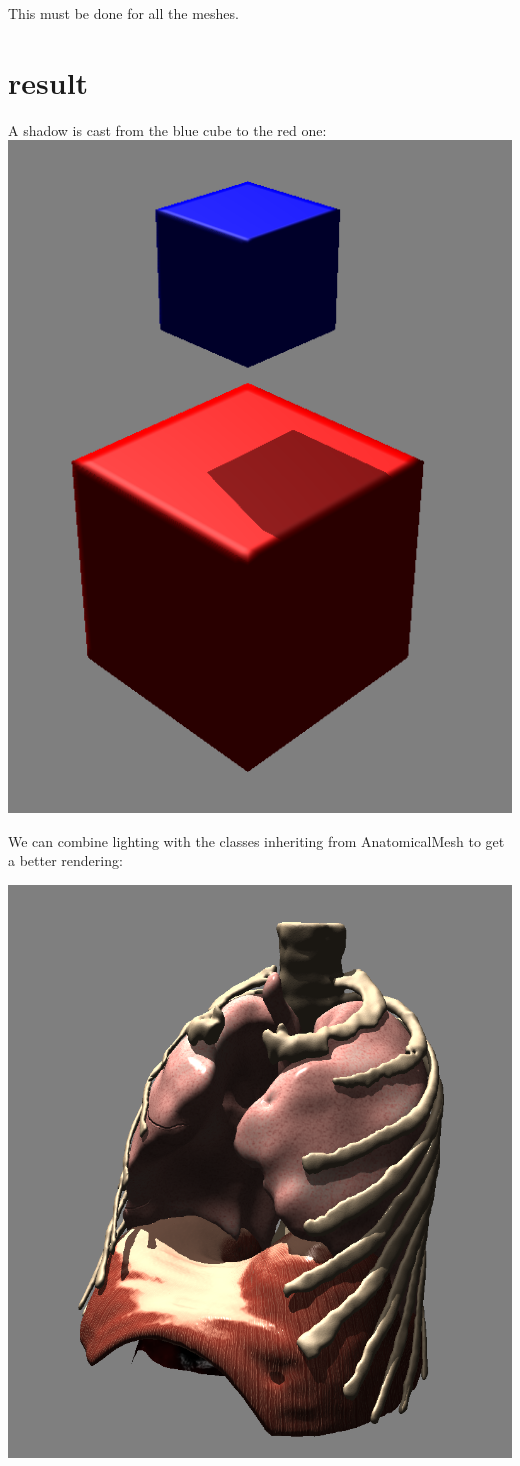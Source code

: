 \documentclass[12pt]{report}
\begin{document}
This must be done for all the meshes.

\chapter{result}

A shadow is cast from the blue cube to the red one:\\

\includegraphics[scale = 0.6]{img/cubes.png}


\newpage
We can combine lighting with the classes inheriting from AnatomicalMesh to get a better rendering:

\includegraphics[scale = 0.6]{img/AllMeshesLighting.png}
 
\end{document}
